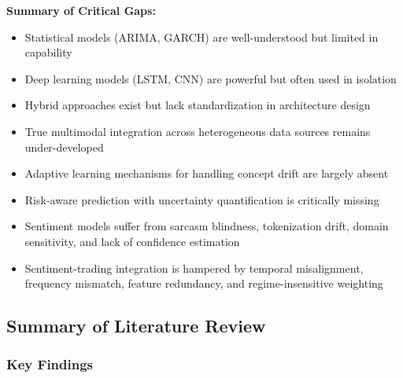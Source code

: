 \textbf{Summary of Critical Gaps:}
\begin{itemize}
    \item Statistical models (ARIMA, GARCH) are well-understood but limited in capability
    \item Deep learning models (LSTM, CNN) are powerful but often used in isolation
    \item Hybrid approaches exist but lack standardization in architecture design
    \item True multimodal integration across heterogeneous data sources remains under-developed
    \item Adaptive learning mechanisms for handling concept drift are largely absent
    \item Risk-aware prediction with uncertainty quantification is critically missing
    \item Sentiment models suffer from sarcasm blindness, tokenization drift, domain sensitivity, and lack of confidence estimation
    \item Sentiment-trading integration is hampered by temporal misalignment, frequency mismatch, feature redundancy, and regime-insensitive weighting
\end{itemize}

\subsection{Summary of Literature Review}

\subsubsection{Key Findings}

